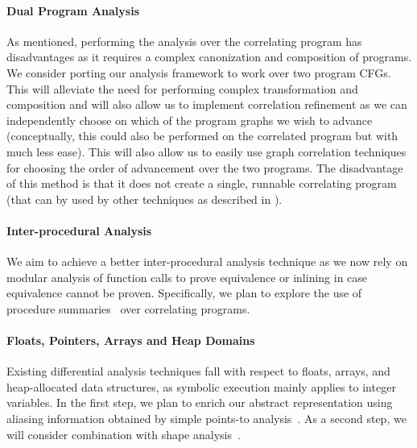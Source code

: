\paragraph{Dual Program Analysis}
As mentioned, performing the analysis over the correlating program has disadvantages as it requires a complex canonization and composition of programs. We consider porting our analysis framework to work over two program CFGs. This will alleviate the need for performing complex transformation and composition and will also allow us to implement correlation refinement as we can independently choose on which of the program graphs we wish to advance (conceptually, this could also be performed on the correlated program but with much less ease). This will also allow us to easily use graph correlation techniques for choosing the order of advancement over the two programs. The disadvantage of this method is that it does not create a single, runnable correlating program (that can by used by other techniques as described in ).

\paragraph{Inter-procedural Analysis}
We aim to achieve a better inter-procedural analysis technique as we now rely on modular analysis of function calls to prove equivalence or inlining in case equivalence cannot be proven. Specifically, we plan to explore the use of procedure summaries~\cite{RepsHorwitzSagiv95} over correlating programs.

\paragraph{Floats, Pointers, Arrays and Heap Domains}
Existing differential analysis techniques fall with respect to floats, arrays, and heap-allocated data structures, as symbolic execution mainly applies to integer variables. In the first step, we plan to enrich our abstract representation using aliasing information obtained by simple points-to analysis~\cite{Steensgaard96,Andersen94}. As a second step, we will consider combination with shape analysis~\cite{SagivRepsWilhelm02}.


